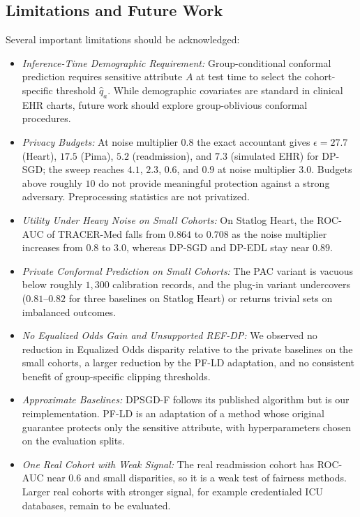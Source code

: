 \documentclass[pdflatex,sn-vancouver-num,referee,lineno]{sn-jnl}
\theoremstyle{thmstyleone}
\theoremstyle{thmstylethree}
\begin{document}
\subsection{Limitations and Future Work}
Several important limitations should be acknowledged:
\begin{itemize}
    \item \emph{Inference-Time Demographic Requirement:} Group-conditional conformal prediction requires sensitive attribute $A$ at test time to select the cohort-specific threshold $\hat{q}_a$. While demographic covariates are standard in clinical EHR charts, future work should explore group-oblivious conformal procedures.
    \item \emph{Privacy Budgets:} At noise multiplier $0.8$ the exact accountant gives $\epsilon = 27.7$ (Heart), $17.5$ (Pima), $5.2$ (readmission), and $7.3$ (simulated EHR) for DP-SGD; the sweep reaches $4.1$, $2.3$, $0.6$, and $0.9$ at noise multiplier $3.0$. Budgets above roughly $10$ do not provide meaningful protection against a strong adversary. Preprocessing statistics are not privatized.
    \item \emph{Utility Under Heavy Noise on Small Cohorts:} On Statlog Heart, the ROC-AUC of TRACER-Med falls from $0.864$ to $0.708$ as the noise multiplier increases from $0.8$ to $3.0$, whereas DP-SGD and DP-EDL stay near $0.89$.
    \item \emph{Private Conformal Prediction on Small Cohorts:} The PAC variant is vacuous below roughly $1{,}300$ calibration records, and the plug-in variant undercovers ($0.81$--$0.82$ for three baselines on Statlog Heart) or returns trivial sets on imbalanced outcomes.
    \item \emph{No Equalized Odds Gain and Unsupported REF-DP:} We observed no reduction in Equalized Odds disparity relative to the private baselines on the small cohorts, a larger reduction by the PF-LD adaptation, and no consistent benefit of group-specific clipping thresholds.
    \item \emph{Approximate Baselines:} DPSGD-F follows its published algorithm but is our reimplementation. PF-LD is an adaptation of a method whose original guarantee protects only the sensitive attribute, with hyperparameters chosen on the evaluation splits.
    \item \emph{One Real Cohort with Weak Signal:} The real readmission cohort has ROC-AUC near $0.6$ and small disparities, so it is a weak test of fairness methods. Larger real cohorts with stronger signal, for example credentialed ICU databases, remain to be evaluated.

\end{itemize}
\end{document}
